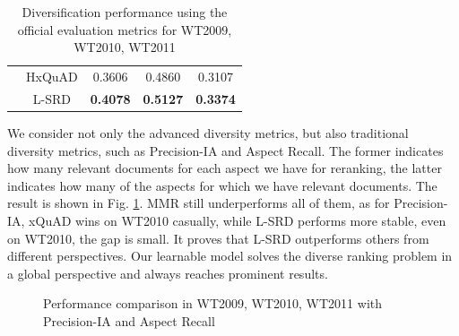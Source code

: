 \documentclass[review]{elsarticle}
\begin{document}
\begin{table}[!htb]
\begin{tabular}{|c|c|c|c|c|}
							   & HxQuAD  & 0.3606 & 0.4860 &  0.3107  \\
                               & L-SRD  & \textbf{0.4078} & \textbf{0.5127} & \textbf{0.3374} \\

\hline
\end{tabular}
\caption{Diversification performance using the official evaluation metrics for WT2009, WT2010, WT2011}
\label{tab1}
\end{table}

We consider not only the advanced diversity metrics, but also traditional diversity metrics, such as Precision-IA and Aspect Recall. The former indicates how many relevant documents for each aspect we have for reranking, the latter indicates how many of the aspects for which we have relevant documents. The result is shown in Fig. \ref{fig4}. MMR still underperforms all of them, as for Precision-IA, xQuAD wins on WT2010 casually, while L-SRD performs more stable, even on WT2010, the gap is small. It proves that L-SRD outperforms others from different perspectives. Our learnable model solves the diverse ranking problem in a global perspective and always reaches prominent results.

\begin{figure}[htb]
\centering
{}
\caption{Performance comparison in WT2009, WT2010, WT2011 with Precision-IA and Aspect Recall}
\label{fig4}
\end{figure}
\end{document}
